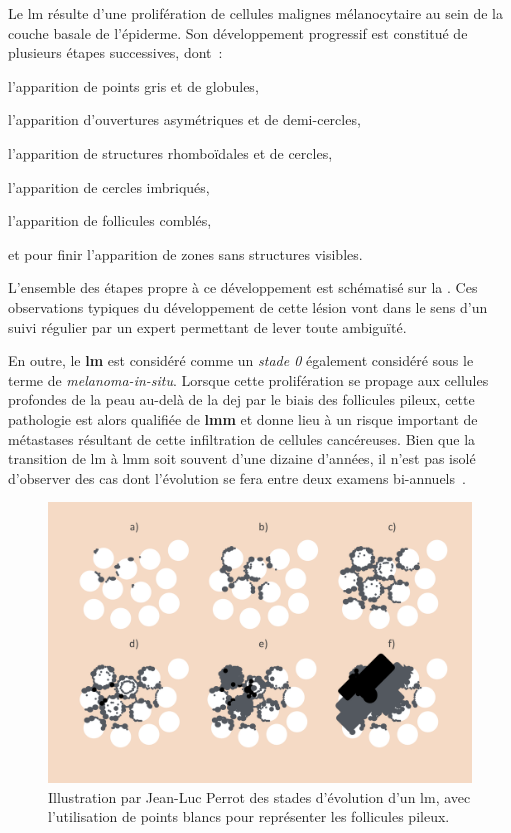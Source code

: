 Le \gls{lm} résulte d'une prolifération de cellules malignes mélanocytaire au sein de la couche basale de l'épiderme. Son développement progressif est constitué de plusieurs étapes successives, dont~:
\begin{inlinerate}[label=(\alph*)]
    \item l'apparition de points gris et de globules,
    \item l'apparition d'ouvertures asymétriques et de demi-cercles,
    \item l'apparition de structures rhomboïdales et de cercles,
    \item l'apparition de cercles imbriqués,
    \item l'apparition de follicules comblés,
    \item et pour finir l'apparition de zones sans structures visibles.
\end{inlinerate} 
L'ensemble des étapes propre à ce développement est schématisé sur la . Ces observations typiques du développement de cette lésion vont dans le sens d'un suivi régulier par un expert permettant de lever toute ambiguïté.\par

En outre, le \textbf{\gls{lm}} est considéré comme un \textit{stade 0} également considéré sous le terme de \textit{melanoma-in-situ}. Lorsque cette prolifération se propage aux cellules profondes de la peau au-delà de la \gls{dej} par le biais des follicules pileux, cette pathologie est alors qualifiée de \textbf{\gls{lmm}} et donne lieu à un risque important de métastases résultant de cette infiltration de cellules cancéreuses. Bien que la transition de \gls{lm} à \gls{lmm} soit souvent d'une dizaine d'années, il n'est pas isolé d'observer des cas dont l'évolution se fera entre deux examens bi-annuels~\cite{Mckenna2006, LeGal2011}. 

\begin{figure}[H]
    \centering
    \includegraphics[width=\linewidth]{contents/chapter_1/resources/illustration_surface_progression.pdf}
    \caption{Illustration par Jean-Luc Perrot des stades d'évolution d'un \gls{lm}, avec l'utilisation de points blancs pour représenter les follicules pileux.}
    \label{fig:illustration_surface_progression}
\end{figure}\par

